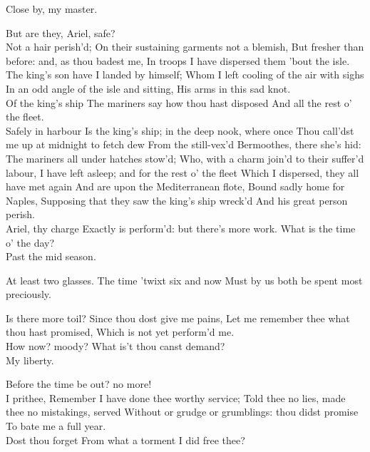 \documentclass[11pt]{book}
\begin{document}
\4	Close by, my master.

\1	But are they, Ariel, safe? \\

\4	Not a hair perish'd;
	On their sustaining garments not a blemish,
	But fresher than before: and, as thou badest me,
	In troops I have dispersed them 'bout the isle.
	The king's son have I landed by himself;
	Whom I left cooling of the air with sighs
	In an odd angle of the isle and sitting,
	His arms in this sad knot.  \\

\1	Of the king's ship
	The mariners say how thou hast disposed
	And all the rest o' the fleet. \\

\4	Safely in harbour
	Is the king's ship; in the deep nook, where once
	Thou call'dst me up at midnight to fetch dew
	From the still-vex'd Bermoothes, there she's hid:
	The mariners all under hatches stow'd;
	Who, with a charm join'd to their suffer'd labour,
	I have left asleep; and for the rest o' the fleet
	Which I dispersed, they all have met again
	And are upon the Mediterranean flote,
	Bound sadly home for Naples,
	Supposing that they saw the king's ship wreck'd
	And his great person perish. \\

\1	Ariel, thy charge
	Exactly is perform'd: but there's more work.
	What is the time o' the day?  \\

\4	Past the mid season.

\1	At least two glasses. The time 'twixt six and now
	Must by us both be spent most preciously.

\4	Is there more toil? Since thou dost give me pains,
	Let me remember thee what thou hast promised,
	Which is not yet perform'd me. \\

\1	How now? moody?
	What is't thou canst demand? \\

\4	My liberty.

\1	Before the time be out? no more! \\

\4	I prithee,
	Remember I have done thee worthy service;
	Told thee no lies, made thee no mistakings, served
	Without or grudge or grumblings: thou didst promise
	To bate me a full year. \\

\1	Dost thou forget
	From what a torment I did free thee? \\
\end{document}
